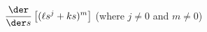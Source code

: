 $\displaystyle \frac{\der}{\der s} \left[(\ell s^j+ks)^m\right]$ \qquad (where $j\ne0$ and $m\ne0$)
\answercheck
